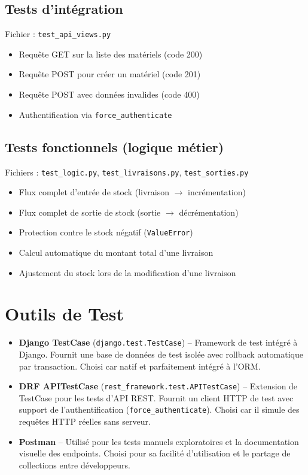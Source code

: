 \documentclass[12pt,a4paper]{report}
\begin{document}
\section{Tests d'intégration}
Fichier : \texttt{test\_api\_views.py}
\begin{itemize}
    \item Requête GET sur la liste des matériels (code 200)
    \item Requête POST pour créer un matériel (code 201)
    \item Requête POST avec données invalides (code 400)
    \item Authentification via \texttt{force\_authenticate}
\end{itemize}

\section{Tests fonctionnels (logique métier)}
Fichiers : \texttt{test\_logic.py}, \texttt{test\_livraisons.py}, \texttt{test\_sorties.py}
\begin{itemize}
    \item Flux complet d'entrée de stock (livraison $\rightarrow$ incrémentation)
    \item Flux complet de sortie de stock (sortie $\rightarrow$ décrémentation)
    \item Protection contre le stock négatif (\texttt{ValueError})
    \item Calcul automatique du montant total d'une livraison
    \item Ajustement du stock lors de la modification d'une livraison
\end{itemize}

\chapter{Outils de Test}

\begin{itemize}[leftmargin=*]
    \item \textbf{Django TestCase} (\texttt{django.test.TestCase}) -- Framework de test intégré à Django. Fournit une base de données de test isolée avec rollback automatique par transaction. Choisi car natif et parfaitement intégré à l'ORM.
    \item \textbf{DRF APITestCase} (\texttt{rest\_framework.test.APITestCase}) -- Extension de TestCase pour les tests d'API REST. Fournit un client HTTP de test avec support de l'authentification (\texttt{force\_authenticate}). Choisi car il simule des requêtes HTTP réelles sans serveur.
    \item \textbf{Postman} -- Utilisé pour les tests manuels exploratoires et la documentation visuelle des endpoints. Choisi pour sa facilité d'utilisation et le partage de collections entre développeurs.
\end{itemize}
\end{document}
